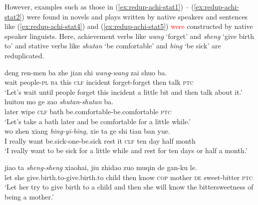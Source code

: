 \documentclass[11pt,a4paper,fleqn,draft]{article}
\newcommand{\added}[1]{\textcolor{red}{#1}}
\let\textbf\emph
\begin{document}
However, examples such as those in (\ref{ex:redup-achi-stat1}) -- (\ref{ex:redup-achi-stat2}) were found in novels and plays written by native speakers and  sentences like (\ref{ex:redup-achi-stat4}) and (\ref{ex:redup-achi-stat5}) \added{were} constructed by native speaker linguists.
Here, achievement verbs like \emph{wang} `forget' and \emph{sheng} `give birth to' and stative verbs like \emph{shutan} `be comfortable' and \emph{bing} `be sick' are reduplicated.

\ea
\ea\label{ex:redup-achi-stat1}
\gll deng ren-men ba zhe jian shi \textbf{wang}-\textbf{wang} zai shuo ba.\footnotemark\\
wait people-\textsc{pl} \textsc{ba} this \textsc{clf} incident forget-forget then talk \textsc{ptc}\\
\glt `Let's wait until people forget this incident a little bit and then talk about it.'\\

\ex\label{ex:redup-achi-stat2}
\gll huitou mo ge zao \textbf{shutan}-\textbf{shutan} ba.\footnotemark\\
later wipe \textsc{clf} bath be.comfortable-be.comfortable \textsc{ptc}\\
\glt `Let's take a bath later and be comfortable for a little while.'\\

\ex\label{ex:redup-achi-stat4}
\gll wo zhen xiang \textbf{bing-yi-bing}, xie ta ge shi tian ban yue.\\
I really want be.sick-one-be.sick rest it \textsc{clf} ten day half month\\ 
\glt `I really want to be sick for a little while and rest for ten days or half a month.'

\ex\label{ex:redup-achi-stat5}
\gll jiao ta \textbf{sheng-sheng} xiaohai, jiu zhidao zuo muqin de gan-ku le.\\
let she give.birth.to-give.birth.to child then know \textsc{cop} mother \textsc{de} sweet-bitter \textsc{ptc}\\ 
\glt `Let her try to give birth to a child and then she will know the bittersweetness of being a mother.'
\z
\z
\end{document}
